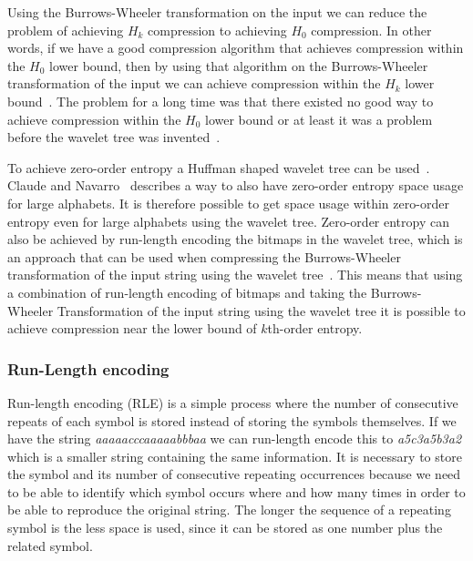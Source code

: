 Using the Burrows-Wheeler transformation on the input we can reduce the problem of achieving $H_k$ compression to achieving $H_0$ compression.
In other words, if we have a good compression algorithm that achieves compression within the $H_0$ lower bound, then by using that algorithm on the Burrows-Wheeler transformation of the input we can achieve compression within the $H_k$ lower bound~.
The problem for a long time was that there existed no good way to achieve compression within the $H_0$ lower bound or at least it was a problem before the wavelet tree was invented~.

To achieve zero-order entropy a Huffman shaped wavelet tree can be used~. Claude and Navarro~ describes a way to also have zero-order entropy space usage for large alphabets. 
It is therefore possible to get space usage within zero-order entropy even for large alphabets using the wavelet tree. 
Zero-order entropy can also be achieved by run-length encoding the bitmaps in the wavelet tree, which is an approach that can be used when compressing the Burrows-Wheeler transformation of the input string using the wavelet tree~.
This means that using a combination of run-length encoding of bitmaps and taking the Burrows-Wheeler Transformation of the input string using the wavelet tree it is possible to achieve compression near the lower bound of $k$th-order entropy.

\subsubsection{Run-Length encoding}
\label{sec:RLE}
Run-length encoding (RLE) is a simple process where the number of consecutive repeats of each symbol is stored instead of storing the symbols themselves. 
If we have the string \textit{aaaaacccaaaaabbbaa} we can run-length encode this to \textit{a5c3a5b3a2} which is a smaller string containing the same information.
It is necessary to store the symbol and its number of consecutive repeating occurrences because we need to be able to identify which symbol occurs where and how many times in order to be able to reproduce the original string.
The longer the sequence of a repeating symbol is the less space is used, since it can be stored as one number plus the related symbol.

